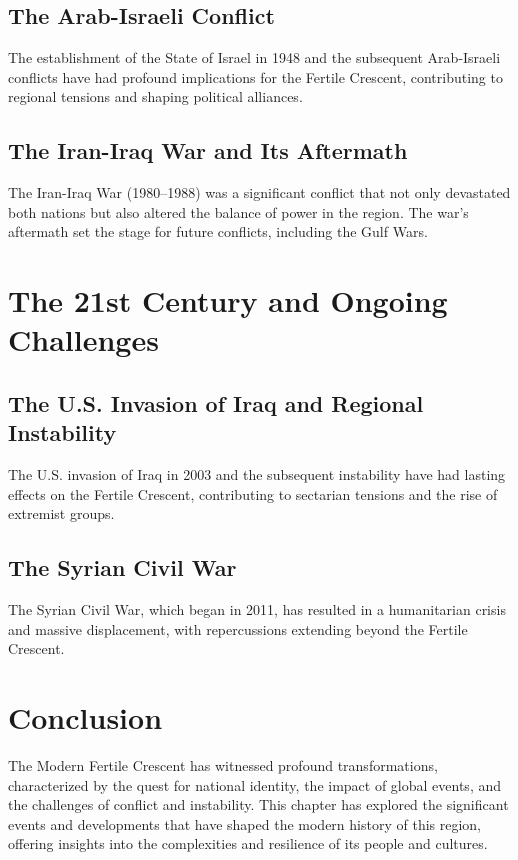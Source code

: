 \documentclass[a4paper,12pt]{book}
\begin{document}
\subsection{The Arab-Israeli Conflict}
The establishment of the State of Israel in 1948 and the subsequent Arab-Israeli conflicts have had profound implications for the Fertile Crescent, contributing to regional tensions and shaping political alliances.

\subsection{The Iran-Iraq War and Its Aftermath}
The Iran-Iraq War (1980–1988) was a significant conflict that not only devastated both nations but also altered the balance of power in the region. The war's aftermath set the stage for future conflicts, including the Gulf Wars.

\section{The 21st Century and Ongoing Challenges}
\label{sec:21st-century-challenges}

\subsection{The U.S. Invasion of Iraq and Regional Instability}
The U.S. invasion of Iraq in 2003 and the subsequent instability have had lasting effects on the Fertile Crescent, contributing to sectarian tensions and the rise of extremist groups.

\subsection{The Syrian Civil War}
The Syrian Civil War, which began in 2011, has resulted in a humanitarian crisis and massive displacement, with repercussions extending beyond the Fertile Crescent.

\section{Conclusion}
\label{sec:conclusion-modern-fertile-crescent}

The Modern Fertile Crescent has witnessed profound transformations, characterized by the quest for national identity, the impact of global events, and the challenges of conflict and instability. This chapter has explored the significant events and developments that have shaped the modern history of this region, offering insights into the complexities and resilience of its people and cultures.
\end{document}
